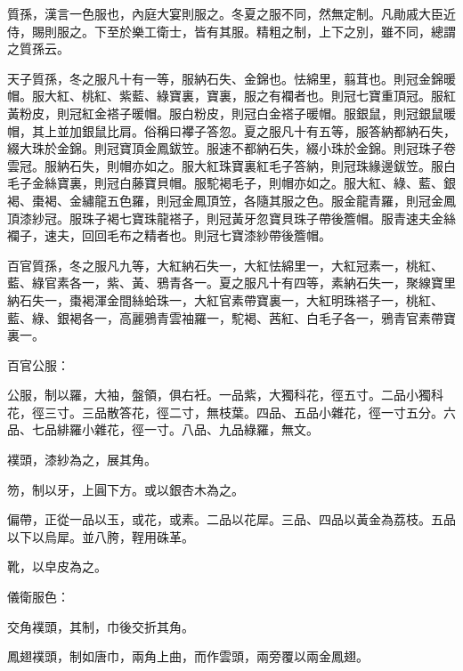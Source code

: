 \begin{pinyinscope}
 質孫，漢言一色服也，內庭大宴則服之。冬夏之服不同，然無定制。凡勛戚大臣近侍，賜則服之。下至於樂工衛士，皆有其服。精粗之制，上下之別，雖不同，總謂之質孫云。



 天子質孫，冬之服凡十有一等，服納石失、金錦也。怯綿里，翦茸也。則冠金錦暖帽。服大紅、桃紅、紫藍、綠寶裏，寶裏，服之有襴者也。則冠七寶重頂冠。服紅黃粉皮，則冠紅金褡子暖帽。服白粉皮，則冠白金褡子暖帽。服銀鼠，則冠銀鼠暖帽，其上並加銀鼠比肩。俗稱曰襻子答忽。夏之服凡十有五等，服答納都納石失，綴大珠於金錦。則冠寶頂金鳳鈸笠。服速不都納石失，綴小珠於金錦。則冠珠子卷雲冠。服納石失，則帽亦如之。服大紅珠寶裏紅毛子答納，則冠珠緣邊鈸笠。服白毛子金絲寶裏，則冠白藤寶貝帽。服駝褐毛子，則帽亦如之。服大紅、綠、藍、銀褐、棗褐、金繡龍五色羅，則冠金鳳頂笠，各隨其服之色。服金龍青羅，則冠金鳳頂漆紗冠。服珠子褐七寶珠龍褡子，則冠黃牙忽寶貝珠子帶後簷帽。服青速夫金絲襴子，速夫，回回毛布之精者也。則冠七寶漆紗帶後簷帽。



 百官質孫，冬之服凡九等，大紅納石失一，大紅怯綿里一，大紅冠素一，桃紅、藍、綠官素各一，紫、黃、鴉青各一。夏之服凡十有四等，素納石失一，聚線寶里納石失一，棗褐渾金間絲蛤珠一，大紅官素帶寶裏一，大紅明珠褡子一，桃紅、藍、綠、銀褐各一，高麗鴉青雲袖羅一，駝褐、茜紅、白毛子各一，鴉青官素帶寶裏一。



 百官公服：



 公服，制以羅，大袖，盤領，俱右衽。一品紫，大獨科花，徑五寸。二品小獨科花，徑三寸。三品散答花，徑二寸，無枝葉。四品、五品小雜花，徑一寸五分。六品、七品緋羅小雜花，徑一寸。八品、九品綠羅，無文。



 襆頭，漆紗為之，展其角。



 笏，制以牙，上圓下方。或以銀杏木為之。



 偏帶，正從一品以玉，或花，或素。二品以花犀。三品、四品以黃金為荔枝。五品以下以烏犀。並八胯，鞓用硃革。



 靴，以皁皮為之。



 儀衛服色：



 交角襆頭，其制，巾後交折其角。



 鳳翅襆頭，制如唐巾，兩角上曲，而作雲頭，兩旁覆以兩金鳳翅。




\end{pinyinscope}
